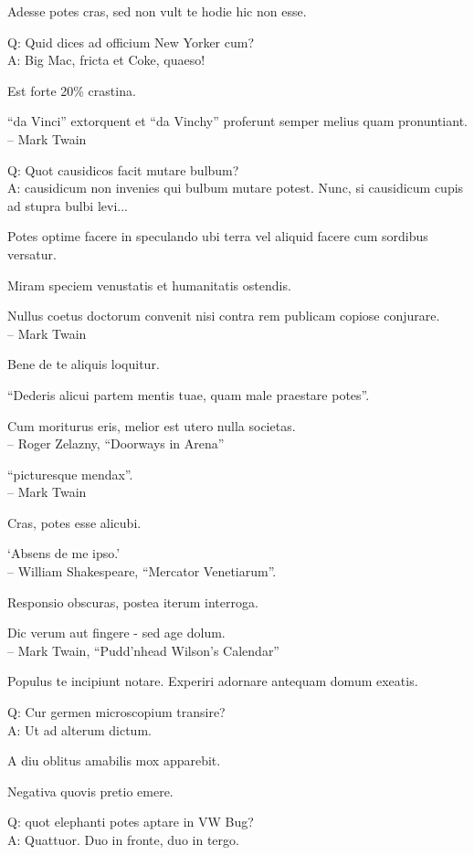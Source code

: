 \documentclass[titlepage,12pt]{memoir}
\begin{document}
Adesse potes cras, sed non vult te hodie hic non esse.

Q: Quid dices ad officium New Yorker cum?\\
A: Big Mac, fricta et Coke, quaeso!

Est forte 20\% crastina.

“da Vinci” extorquent et “da Vinchy” proferunt
semper melius quam pronuntiant.
\\-- Mark Twain

Q: Quot causidicos facit mutare bulbum?\\
A: causidicum non invenies qui bulbum mutare potest. Nunc, si
causidicum cupis ad stupra bulbi levi...

Potes optime facere in speculando ubi terra vel aliquid facere cum sordibus
versatur.

 Miram speciem venustatis et humanitatis ostendis.

Nullus coetus doctorum convenit nisi contra rem publicam copiose conjurare.
\\-- Mark Twain

 Bene de te aliquis loquitur.

“Dederis alicui partem mentis tuae, quam male praestare potes”.

Cum moriturus eris, melior est utero nulla societas.
\\-- Roger Zelazny, “Doorways in Arena”

“picturesque mendax”.
\\-- Mark Twain

Cras, potes esse alicubi.

‘Absens de me ipso.’
\\-- William Shakespeare, “Mercator Venetiarum”.

Responsio obscuras, postea iterum interroga.

Dic verum aut fingere - sed age dolum.
\\-- Mark Twain, “Pudd’nhead Wilson’s Calendar”

Populus te incipiunt notare. Experiri adornare antequam domum exeatis.

Q: Cur germen microscopium transire?\\
A: Ut ad alterum dictum.

A diu oblitus amabilis mox apparebit.

Negativa quovis pretio emere.

Q: quot elephanti potes aptare in VW Bug?\\
A: Quattuor. Duo in fronte, duo in tergo.
\end{document}
